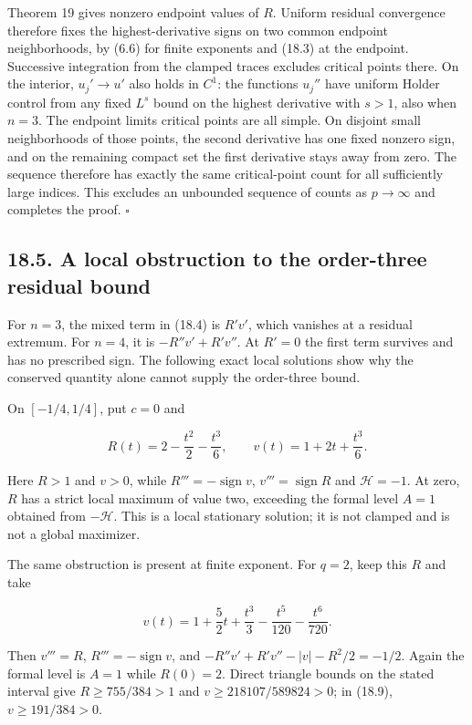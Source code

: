 \documentclass[11pt]{article}
\begin{document}
Theorem 19 gives nonzero endpoint values of \(R\). Uniform residual
convergence therefore fixes the highest-derivative signs on two common
endpoint neighborhoods, by (6.6) for finite exponents and (18.3) at the
endpoint. Successive integration from the clamped traces excludes
critical points there. On the interior, \(u_j'\to u'\) also holds in
\(C^1\): the functions \(u_j''\) have uniform Holder control from any
fixed \(L^s\) bound on the highest derivative with \(s>1\), also when
\(n=3\). The endpoint limit\textquotesingle s critical points are all
simple. On disjoint small neighborhoods of those points, the second
derivative has one fixed nonzero sign, and on the remaining compact set
the first derivative stays away from zero. The sequence therefore has
exactly the same critical-point count for all sufficiently large
indices. This excludes an unbounded sequence of counts as \(p\to\infty\)
and completes the proof. \(\square\)

\subsection{18.5. A local obstruction to the order-three residual
bound}\label{a-local-obstruction-to-the-order-three-residual-bound}

For \(n=3\), the mixed term in (18.4) is \(R'v'\), which vanishes at a
residual extremum. For \(n=4\), it is \(-R''v'+R'v''\). At \(R'=0\) the
first term survives and has no prescribed sign. The following exact
local solutions show why the conserved quantity alone cannot supply the
order-three bound.

On \([-1/4,1/4]\), put \(c=0\) and

\[
R(t)=2-\frac{t^2}{2}-\frac{t^3}{6},\qquad
v(t)=1+2t+\frac{t^3}{6}.
\tag{18.9}
\]

Here \(R>1\) and \(v>0\), while \(R'''=-\operatorname{sign}v\),
\(v'''=\operatorname{sign}R\) and \(\mathcal H=-1\). At zero, \(R\) has
a strict local maximum of value two, exceeding the formal level \(A=1\)
obtained from \(-\mathcal H\). This is a local stationary solution; it
is not clamped and is not a global maximizer.

The same obstruction is present at finite exponent. For \(q=2\), keep
this \(R\) and take

\[
v(t)=1+\frac52t+\frac{t^3}{3}-\frac{t^5}{120}-\frac{t^6}{720}.
\tag{18.10}
\]

Then \(v'''=R\), \(R'''=-\operatorname{sign}v\), and
\(-R''v'+R'v''-|v|-R^2/2=-1/2\). Again the formal level is \(A=1\) while
\(R(0)=2\). Direct triangle bounds on the stated interval give
\(R\ge755/384>1\) and \(v\ge218107/589824>0\); in (18.9),
\(v\ge191/384>0\).
\end{document}
